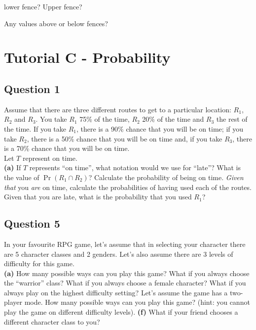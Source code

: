 \documentclass[]{article}
\begin{document}
lower fence?
Upper fence?

Any values above or below fences?

\newpage
\section{Tutorial C - Probability}	
\subsection*{Question 1}
Assume that there are three different routes to get to a particular location: $R_1$, $R_2$ and $R_3$. You take $R_1$ 75\% of the time, $R_2$ 20\% of the time and $R_3$ the rest of the time. If you take $R_1$, there is a 90\% chance that you will be on time; if you take $R_2$, there is a 50\% chance that you will be on time and, if you take $R_3$, there is a 70\% chance that you will be on time. \\[0.1cm]
Let $T$ represent on time.\\[-0.2cm]

{\bf(a)} If $T$ represents ``on time'', what notation would we use for ``late''?  What is the value of $\Pr(R_1 \cap R_2)$?  Calculate the probability of being on time.  \emph{Given that} you \emph{are} on time, calculate the probabilities of having used each of the routes.  Given that you are late, what is the probability that you used $R_1$?






\subsection*{Question 5}
In your favourite RPG game, let's assume that in selecting your character there are 5 character classes and 2 genders. Let's also assume there are 3 levels of difficulty for this game.\\[-0.2cm]

{\bf(a)} How many possible ways can you play this game?  What if you always choose the ``warrior'' class?  What if you always choose a female character?  What if you always play on the highest difficulty setting?  Let's assume the game has a two-player mode. How many possible ways can you play this game? (hint: you cannot play the game on different difficulty levels). {\bf(f)} What if your friend chooses a different character class to you?
\end{document}
